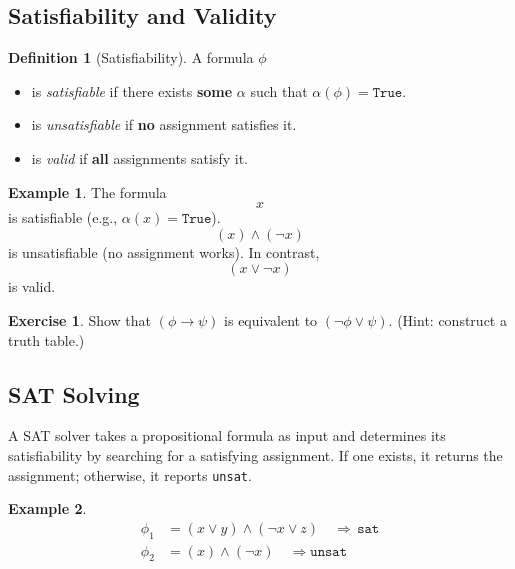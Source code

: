 \documentclass[oneside,11pt,dvipsnames]{book}
\numberwithin{equation}{section}
\theoremstyle{definition}
\newtheorem{definition}{Definition}[section]
\newtheorem{example}{Example}[section]
\newtheorem{exercise}{Exercise}[section]
\theoremstyle{remark}
\newcommand{\sat}{\texttt{sat}}
\newcommand{\unsat}{\texttt{unsat}}
\begin{document}
\subsection{Satisfiability and Validity}
\begin{definition}[Satisfiability] A formula $\phi$

\begin{itemize}
  \item is \emph{satisfiable} if there exists \textbf{some} $\alpha$ such that $\alpha(\phi) = \texttt{True}$.
  \item is \emph{unsatisfiable} if \textbf{no} assignment satisfies it.
  \item is \emph{valid} if \textbf{all} assignments satisfy it.
\end{itemize}
\end{definition}

\begin{example} The formula
    \[x\]
    is satisfiable (e.g., $\alpha(x) = \texttt{True}$).
\[
(x) \land (\lnot x)
\]
is unsatisfiable (no assignment works).
In contrast,
\[
(x \lor \lnot x)
\]
is valid.
\end{example}

\begin{exercise}
Show that $(\phi \to \psi)$ is equivalent to $(\lnot \phi \lor \psi)$.  
(Hint: construct a truth table.)
\end{exercise}


\subsection{SAT Solving}\label{sec:sat-solving}

A SAT solver takes a propositional formula as input and determines its satisfiability by searching for a satisfying assignment. If one exists, it returns the assignment; otherwise, it reports \unsat{}. %

\begin{example}
\begin{align*}
\phi_1 &= (x \lor y) \land (\lnot x \lor z) \quad \Rightarrow \, \sat{}\\
\phi_2 &= (x) \land (\lnot x) \quad \Rightarrow \unsat{}
\end{align*}
\end{example}
\end{document}
